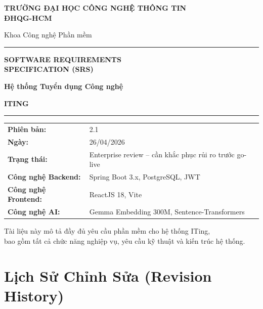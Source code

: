 \documentclass[12pt, a4paper]{report}
\begin{document}
\begin{titlepage}
\centering
\vspace*{2cm}

{\huge\bfseries\color{primaryblue} TRƯỜNG ĐẠI HỌC CÔNG NGHỆ THÔNG TIN\\
ĐHQG-HCM}

\vspace{0.5cm}
{\large Khoa Công nghệ Phần mềm}

\vspace{2cm}
\rule{\linewidth}{0.5mm}
\vspace{0.5cm}

{\Huge\bfseries SOFTWARE REQUIREMENTS\\[0.3cm] SPECIFICATION (SRS)}

\vspace{0.3cm}
{\LARGE\bfseries\color{primaryblue} Hệ thống Tuyển dụng Công nghệ}

\vspace{0.2cm}
{\huge\bfseries\color{dangered} ITING}

\vspace{0.5cm}
\rule{\linewidth}{0.5mm}

\vspace{2cm}

\begin{tabular}{ll}
\textbf{Phiên bản:} & 2.1 \\[0.3cm]
\textbf{Ngày:} & 26/04/2026 \\[0.3cm]
\textbf{Trạng thái:} & Enterprise review -- cần khắc phục rủi ro trước go-live \\[0.3cm]
\textbf{Công nghệ Backend:} & Spring Boot 3.x, PostgreSQL, JWT \\[0.3cm]
\textbf{Công nghệ Frontend:} & ReactJS 18, Vite \\[0.3cm]
\textbf{Công nghệ AI:} & Gemma Embedding 300M, Sentence-Transformers \\
\end{tabular}

\vfill
{\small Tài liệu này mô tả đầy đủ yêu cầu phần mềm cho hệ thống ITing,\\
bao gồm tất cả chức năng nghiệp vụ, yêu cầu kỹ thuật và kiến trúc hệ thống.}

\end{titlepage}

\tableofcontents
\newpage

\chapter*{Lịch Sử Chỉnh Sửa (Revision History)}
\end{document}
